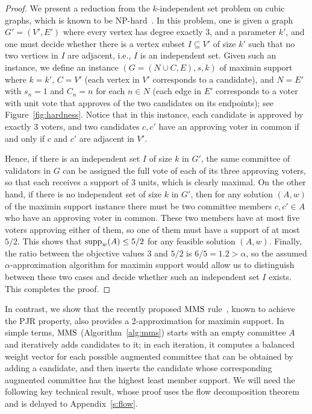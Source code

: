 \begin{proof}
We present a reduction from the $k$-independent set problem on cubic graphs, which is known to be NP-hard~\cite{johnson1979computers}. In this problem, one is given a graph $G'=(V',E')$ where every vertex has degree exactly 3, and a parameter $k'$, and one must decide whether there is a vertex subset $I\subseteq V'$ of size $k'$ such that no two vertices in $I$ are adjacent, i.e., $I$ is an independent set. 
Given such an instance, we define an instance $(G=(N\cup C, E), s, k)$ of maximin support where $k=k'$, $C=V'$ (each vertex in $V'$ corresponds to a candidate), and $N=E'$ with $s_n=1$ and $C_n=n$ for each $n\in N$ (each edge in $E'$ corresponds to a voter with unit vote that approves of the two candidates on its endpoints); see Figure~\ref{fig:hardness}.
Notice that in this instance, each candidate is approved by exactly 3 voters, and two candidates $c, c'$ have an approving voter in common if and only if $c$ and $c'$ are adjacent in $V'$.

Hence, if there is an independent set $I$ of size $k$ in $G'$, the same committee of validators in $G$ can be assigned the full vote of each of its three approving voters, so that each receives a support of 3 units, which is clearly maximal. On the other hand, if there is no independent set of size $k$ in $G'$, then for any solution $(A,w)$ of the maximin support instance there must be two committee members $c,c'\in A$ who have an approving voter in common. These two members have at most five voters approving either of them, so one of them must have a support of at most $5/2$. This shows that $\operatorname{supp}_w(A)\leq 5/2$ for any feasible solution $(A,w)$. Finally, the ratio between the objective values $3$ and $5/2$ is $6/5=1.2>\alpha$, so the assumed $\alpha$-approximation algorithm for maximin support would allow us to distinguish between these two cases and decide whether such an independent set $I$ exists. This completes the proof.
\end{proof}

In contrast, we show that the recently proposed $\operatorname{MMS}$ rule~\cite{sanchez2016maximin}, known to achieve the PJR property, also provides a 2-approximation for maximin support. 
In simple terms, $\operatorname{MMS}$ (Algorithm~\ref{alg:mms}) starts with an empty committee $A$ and iteratively adds candidates to it; in each iteration, it computes a balanced weight vector for each possible augmented committee that can be obtained by adding a candidate, and then inserts the candidate whose corresponding augmented committee has the highest least member support.
%
We will need the following key technical result, whose proof uses the flow decomposition theorem and is delayed to Appendix~\ref{s:flow}. 


